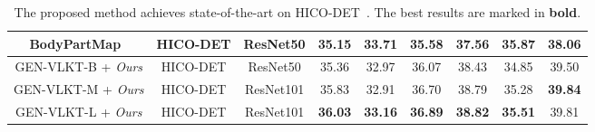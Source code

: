 \documentclass[10pt,twocolumn,letterpaper]{article}
\begin{document}
\begin{table*}
\begin{adjustbox}{width=0.8\linewidth}
\begin{tabular}{c | c c | c c c | c c c}
    BodyPartMap~\cite{wu2022bodypartmap} & HICO-DET & ResNet50 & \textbf{35.15} & \textbf{33.71} & 35.58 & 37.56 & \textbf{35.87} & 38.06 \\
    \midrule
    GEN-VLKT-B + \textit{Ours} & HICO-DET & ResNet50 & 35.36 & 32.97 & 36.07 & 38.43 & 34.85 & 39.50 \\
    GEN-VLKT-M + \textit{Ours} & HICO-DET & ResNet101 & 35.83 & 32.91 & 36.70 & 38.79 & 35.28 & \textbf{39.84} \\
    GEN-VLKT-L + \textit{Ours} & HICO-DET & ResNet101 & \textbf{36.03} & \textbf{33.16} & \textbf{36.89} & \textbf{38.82} & \textbf{35.51} & 39.81 \\
    \bottomrule
  \end{tabular}
  \end{adjustbox}
  \caption{
  The proposed method achieves state-of-the-art on HICO-DET~\cite{chao2018learning}. The best results are marked in \textbf{bold}.
  }
  \vspace{-8pt}
  \label{tab:exp-sota-hicodet}
\end{table*}
\end{document}
